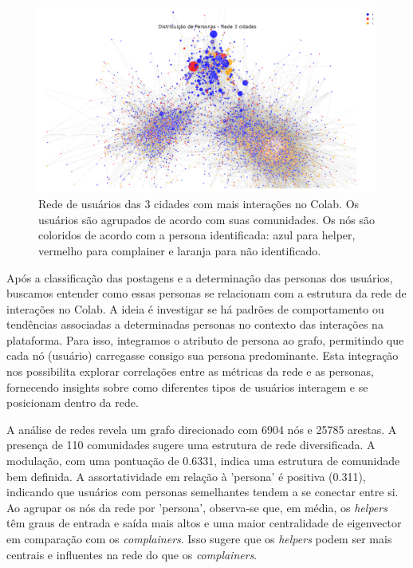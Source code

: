 \begin{figure}[h]
    \centering
    \includegraphics[width=1\textwidth]{images/personas_network.png} 
    \caption{Rede de usuários das 3 cidades com mais interações no Colab. Os usuários são agrupados de acordo com suas comunidades. Os nós são coloridos de acordo com a persona identificada: azul para helper, vermelho para complainer e laranja para não identificado.}
    \label{fig:personas_network}
\end{figure}

Após a classificação das postagens e a determinação das personas dos usuários, buscamos entender como essas personas se relacionam com a estrutura da rede de interações no Colab. A ideia é investigar se há padrões de comportamento ou tendências associadas a determinadas personas no contexto das interações na plataforma. Para isso, integramos o atributo de persona ao grafo, permitindo que cada nó (usuário) carregasse consigo sua persona predominante. Esta integração nos possibilita explorar correlações entre as métricas da rede e as personas, fornecendo insights sobre como diferentes tipos de usuários interagem e se posicionam dentro da rede.

A análise de redes revela um grafo direcionado com 6904 nós e 25785 arestas. A presença de 110 comunidades sugere uma estrutura de rede diversificada. A modulação, com uma pontuação de 0.6331, indica uma estrutura de comunidade bem definida. A assortatividade em relação à 'persona' é positiva (0.311), indicando que usuários com personas semelhantes tendem a se conectar entre si. Ao agrupar os nós da rede por 'persona', observa-se que, em média, os \textit{helpers} têm graus de entrada e saída mais altos e uma maior centralidade de eigenvector em comparação com os \textit{complainers}. Isso sugere que os \textit{helpers} podem ser mais centrais e influentes na rede do que os \textit{complainers}.

